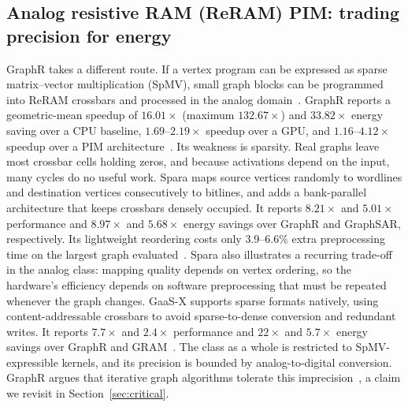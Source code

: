 \documentclass[journal,onecolumn]{IEEEtran}
\begin{document}
\subsection{Analog resistive RAM (ReRAM) PIM: trading precision for energy}
GraphR takes a different route. If a vertex program can be expressed as sparse matrix--vector multiplication (SpMV), small graph blocks can be programmed into ReRAM crossbars and processed in the analog domain~\cite{song2018graphr}. GraphR reports a geometric-mean speedup of $16.01\times$ (maximum $132.67\times$) and $33.82\times$ energy saving over a CPU baseline, $1.69$--$2.19\times$ speedup over a GPU, and $1.16$--$4.12\times$ speedup over a PIM architecture~\cite{song2018graphr}. Its weakness is sparsity. Real graphs leave most crossbar cells holding zeros, and because activations depend on the input, many cycles do no useful work. Spara maps source vertices randomly to wordlines and destination vertices consecutively to bitlines, and adds a bank-parallel architecture that keeps crossbars densely occupied. It reports $8.21\times$ and $5.01\times$ performance and $8.97\times$ and $5.68\times$ energy savings over GraphR and GraphSAR, respectively. Its lightweight reordering costs only 3.9--6.6\% extra preprocessing time on the largest graph evaluated~\cite{zheng2020spara}. Spara also illustrates a recurring trade-off in the analog class: mapping quality depends on vertex ordering, so the hardware's efficiency depends on software preprocessing that must be repeated whenever the graph changes. GaaS-X supports sparse formats natively, using content-addressable crossbars to avoid sparse-to-dense conversion and redundant writes. It reports $7.7\times$ and $2.4\times$ performance and $22\times$ and $5.7\times$ energy savings over GraphR and GRAM~\cite{challapalle2020gaasx}. The class as a whole is restricted to SpMV-expressible kernels, and its precision is bounded by analog-to-digital conversion. GraphR argues that iterative graph algorithms tolerate this imprecision~\cite{song2018graphr}, a claim we revisit in Section~\ref{sec:critical}.
\end{document}
